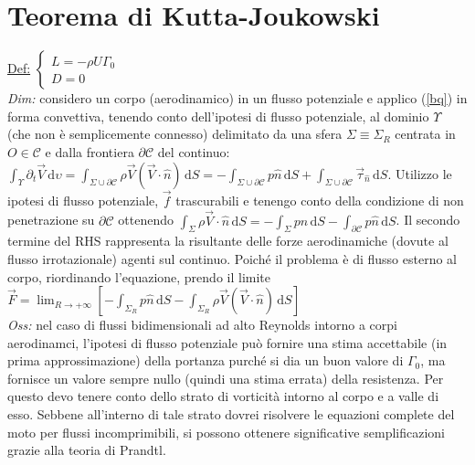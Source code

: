 \documentclass[11pt,a4paper]{report}
\newcommand{\de}{\mathrm d}
\begin{document}
	\section{Teorema di Kutta-Joukowski} 	\label{kutta}
	\underline{Def:} $\begin{cases}L=-\rho U\Gamma_0\\D=0\end{cases}$\\
	\textit{Dim:} considero un corpo (aerodinamico) in un flusso potenziale e applico (\ref{bq}) in forma convettiva, tenendo conto dell'ipotesi di flusso potenziale, al dominio $\Upsilon$ (che non è semplicemente connesso) delimitato da una sfera $\Sigma\equiv\Sigma_R$ centrata in $O\in\mathcal C$ e dalla frontiera $\partial\mathcal C$ del continuo: $\int_\Upsilon\partial_t\vec V\,\de \upsilon=\int_{\Sigma\cup\partial\mathcal C}\rho\vec V(\vec V\cdot\hat n)\,\de S=-\int_{\Sigma\cup\partial\mathcal C}p\hat n\,\de S+\int_{\Sigma\cup\partial\mathcal C}\vec\tau_{\hat n}\,\de S$. Utilizzo le ipotesi di flusso potenziale, $\vec f$ trascurabili e tenengo conto della condizione di non penetrazione su $\partial\mathcal C$ ottenendo $\int_\Sigma\rho\vec V\cdot\hat n\,\de S=-	\int_\Sigma p\hat n\,\de S-\int_{\partial\mathcal C}p\hat n\,\de S$. Il secondo termine del RHS rappresenta la risultante delle forze aerodinamiche (dovute al flusso irrotazionale) agenti sul continuo. Poiché il problema è di flusso esterno al corpo, riordinando l'equazione, prendo il limite $\vec F=\lim_{R\to+\infty}[-\int_{\Sigma_R}p\hat n\,\de S-\int_{\Sigma_R}\rho\vec V(\vec V\cdot\hat n)\,\de S]$\\
	\textit{Oss:} nel caso di flussi bidimensionali ad alto Reynolds intorno a corpi aerodinamci, l'ipotesi di flusso potenziale può fornire una stima accettabile (in prima approssimazione) della portanza purché si dia un buon valore di $\Gamma_0$, ma fornisce un valore sempre nullo (quindi una stima errata) della resistenza. Per questo devo tenere conto dello strato di vorticità intorno al corpo e a valle di esso. Sebbene all'interno di tale strato dovrei risolvere le equazioni complete del moto per flussi incomprimibili, si possono ottenere significative semplificazioni grazie alla teoria di Prandtl. \\\mbox{}\\

\end{document}
